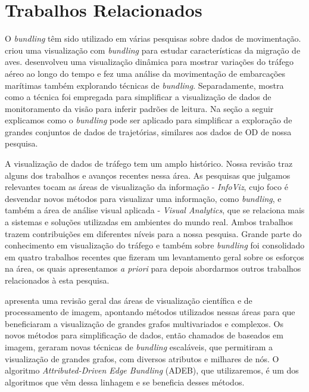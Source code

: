 \chapter{Trabalhos Relacionados}
\label{cap:trabalhos-relacionados}

O \emph{bundling} têm sido utilizado em várias pesquisas sobre dados de movimentação.
\citep{Anita2017} criou uma visualização com \emph{bundling} para estudar características da migração de aves.
\citep{Klein2014} desenvolveu uma visualização dinâmica para mostrar variações do tráfego aéreo ao longo do tempo e
\citep{Willems2009} fez uma análise da movimentação de embarcações marítimas também explorando
técnicas de \emph{bundling}. Separadamente, \citep{Blascheck2017} mostra como a técnica foi
empregada para simplificar a visualização de dados de monitoramento da visão para inferir padrões de leitura. 
Na seção a seguir explicamos como o \emph{bundling} pode ser aplicado para simplificar a exploração
de grandes conjuntos de dados de trajetórias, similares aos dados de OD de nossa pesquisa.

  A visualização de dados de tráfego tem um amplo histórico. Nossa revisão traz
alguns dos trabalhos e avanços recentes nessa área. As pesquisas que julgamos
relevantes tocam as áreas de visualização da informação - \emph{InfoViz}, cujo
foco é desvendar novos métodos para visualizar uma informação, como
\emph{bundling}, e também a área de análise visual aplicada - \emph{Visual
Analytics}, que se relaciona mais a sistemas e soluções utilizadas em ambientes
do mundo real. Ambos trabalhos trazem contribuições em diferentes níveis para a
nossa pesquisa. Grande parte do conhecimento em visualização do tráfego e
também sobre \emph{bundling} foi consolidado em quatro trabalhos recentes que
fizeram um levantamento geral sobre os esforços na área, os quais apresentamos
\emph{a priori} para depois abordarmos outros trabalhos relacionados à esta
pesquisa.

  \citet{Telea2018} apresenta uma revisão geral das áreas de visualização
científica e de processamento de imagem, apontando métodos utilizados nessas
áreas para que beneficiaram a visualização de grandes grafos multivariados e
complexos. Os novos métodos para simplificação de dados, então chamados de
baseados em imagem, geraram novas técnicas de \emph{bundling} escaláveis, que
permitiram a visualização de grandes grafos, com diversos atributos e
milhares de nós. O algoritmo \emph{Attributed-Driven Edge Bundling} (ADEB), que utilizaremos,
é um dos algoritmos que vêm dessa linhagem e se beneficia desses métodos.

